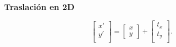 \begin{frame}
    \frametitle{Traslación en 2D}
    \begin{equation*}
        {\displaystyle {\begin{bmatrix}x'\\y'\\\end{bmatrix}}={\begin{bmatrix} x\\y\end{bmatrix}}+{\begin{bmatrix}t_x\\t_y\\\end{bmatrix}}.}
    \end{equation*}
\end{frame}


